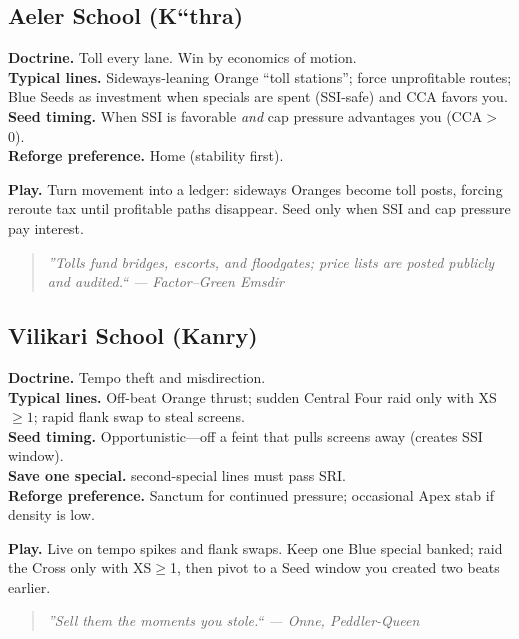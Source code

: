 \documentclass[11pt]{article}
\providecommand{\playdesc}[1]{\par\smallskip\noindent\small\textbf{Play.} #1\par}
\begin{document}
\subsection*{Aeler School (K``thra)}
\textbf{Doctrine.} Toll every lane. Win by economics of motion.\\
\textbf{Typical lines.} Sideways-leaning Orange ``toll stations''; force unprofitable routes; Blue Seeds as investment when specials are spent (SSI-safe) and CCA favors you.\\
\textbf{Seed timing.} When SSI is favorable \emph{and} cap pressure advantages you (CCA$>$0).\\
\textbf{Reforge preference.} Home (stability first).
\playdesc{Turn movement into a ledger: sideways Oranges become toll posts, forcing reroute tax until profitable paths disappear. Seed only when SSI and cap pressure pay interest.}
\begin{quote}\small\itshape
''Tolls fund bridges, escorts, and floodgates; price lists are posted publicly and audited.`` --- Factor--Green Emsdir
\end{quote}

\subsection*{Vilikari School (Kanry)}
\textbf{Doctrine.} Tempo theft and misdirection.\\
\textbf{Typical lines.} Off-beat Orange thrust; sudden Central Four raid only with XS$\ge1$; rapid flank swap to steal screens.\\
\textbf{Seed timing.} Opportunistic---off a feint that pulls screens away (creates SSI window).\\
\textbf{Save one special.} second-special lines must pass SRI. \\
\textbf{Reforge preference.} Sanctum for continued pressure; occasional Apex stab if density is low.
\playdesc{Live on tempo spikes and flank swaps. Keep one Blue special banked; raid the Cross only with XS$\geq$1, then pivot to a Seed window you created two beats earlier.}
\begin{quote}\small\itshape
''Sell them the moments you stole.`` --- Onne, Peddler-Queen
\end{quote}

\end{document}
